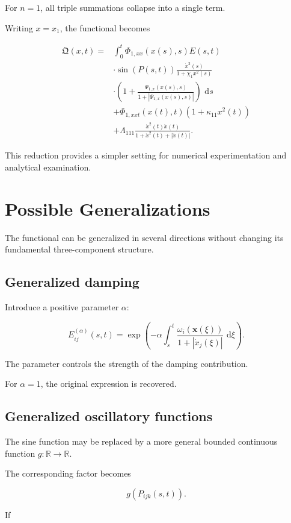\documentclass[12pt]{article}
\numberwithin{equation}{section}
\newcommand{\R}{\mathbb{R}}
\newcommand{\Q}{\mathfrak{Q}}
\newcommand{\dd}{\,\mathrm{d}}
\theoremstyle{definition}
\theoremstyle{remark}
\begin{document}
For \(n=1\), all triple summations
collapse into a single term.

Writing \(x=x_1\), the functional becomes

\[
\begin{aligned}
\Q(x,t)
={}&
\int_0^t
\Phi_{1,xx}(x(s),s)
E(s,t)
\\
&\cdot
\sin(P(s,t))
\frac{\dot{x}^2(s)}
{1+\chi_1x^2(s)}
\\
&\cdot
\left(
1+
\frac{\Psi_{1,x}(x(s),s)}
{1+|\Psi_{1,x}(x(s),s)|}
\right)
\,\dd s
\\
&+
\Phi_{1,xxt}(x(t),t)
(1+\kappa_{11}x^2(t))
\\
&+
\Lambda_{111}
\frac{\dot{x}^2(t)\ddot{x}(t)}
{1+\dot{x}^2(t)+|\ddot{x}(t)|}.
\end{aligned}
\]

This reduction provides a simpler setting
for numerical experimentation and
analytical examination.


\section{Possible Generalizations}

The functional can be generalized in several
directions without changing its fundamental
three-component structure.

\subsection{Generalized damping}

Introduce a positive parameter \(\alpha\):

\[
E_{ij}^{(\alpha)}(s,t)
=
\exp\left(
-\alpha
\int_s^t
\frac{\omega_i(\mathbf{x}(\xi))}
{1+|\dot{x}_j(\xi)|}
\,\dd\xi
\right).
\]

The parameter controls the strength
of the damping contribution.

For \(\alpha=1\), the original expression
is recovered.

\subsection{Generalized oscillatory functions}

The sine function may be replaced by
a more general bounded continuous function
\(g:\R\to\R\).

The corresponding factor becomes

\[
g(P_{ijk}(s,t)).
\]

If
\end{document}
